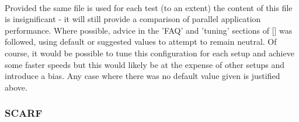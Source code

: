 \documentclass{article}
\begin{document}
            \paragraph{}
            Provided the same file is used for each test (to an extent) the content of this file is insignificant - it will still provide a comparison of parallel application performance. Where possible, advice in the 'FAQ' and 'tuning' sections of [\cite{hpl2016}] was followed, using default or suggested values to attempt to remain neutral. Of course, it would be possible to tune this configuration for each setup and achieve some faster speeds but this would likely be at the expense of other setups and introduce a bias. Any case where there was no default value given is justified above.



        \subsubsection{SCARF}
        \label{running-HPL-SCARF}
\end{document}
